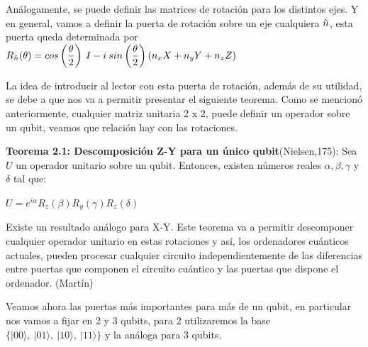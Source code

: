 Análogamente, se puede definir las matrices de rotación para los distintos ejes. Y en general, vamos a definir la puerta de rotación sobre un eje cualquiera $\Hat{n}$, esta puerta queda determinada por $R_{\Hat{n}}(\theta) = cos \left(\dfrac{\theta}{2}\right)\:I - i\:sin\left(\dfrac{\theta}{2}\right)\left(n_{x}X + n_{y}Y + n_{z}Z\right) $ \newline

 La idea de introducir al lector con esta puerta de rotación, además de su utilidad, se debe a que nos va a permitir presentar el siguiente teorema. Como se mencionó anteriormente, cualquier matriz unitaria 2 x 2, puede definir un operador sobre un qubit, veamos que relación hay con las rotaciones. \newline
 
 \textbf{Teorema 2.1: Descomposición Z-Y para un único qubit}(Nielsen,175): Sea $U$ un operador unitario sobre un qubit. Entonces, existen números reales $\alpha,\beta,\gamma$ y $\delta$ tal que:
 \begin{center}
     $U = e^{i\alpha} R_{z}(\beta)R_{y}(\gamma)R_{z}(\delta)$
 \end{center}

 Existe un resultado análogo para X-Y. Este teorema va a permitir descomponer cualquier operador unitario en estas rotaciones y así, los ordenadores cuánticos actuales, pueden procesar cualquier circuito independientemente de las diferencias entre puertas que componen el circuito cuántico y las puertas que dispone el ordenador. (Martín) \newline

 Veamos ahora las puertas más importantes para más de un qubit, en particular nos vamos a fijar en 2 y 3 qubits, para 2 utilizaremos la base $\{|00\rangle,\:|01\rangle,\:|10\rangle,\:|11\rangle\}$ y la análoga para 3 qubits.

